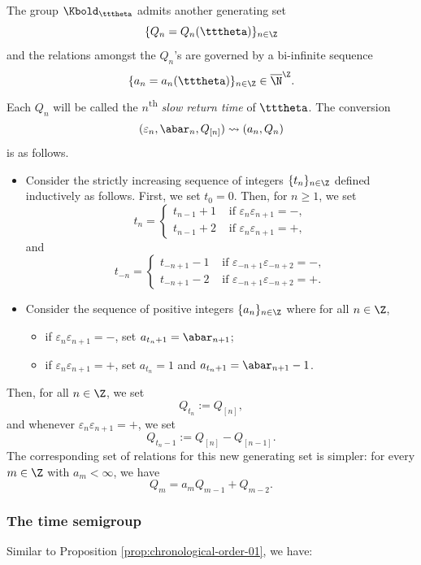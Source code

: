\documentclass{amsart}
\begin{document}
The group $\Kbold_{\tttheta}$ admits another generating set 
\[
\{Q_n=Q_n(\tttheta)\}_{n\in\Z}
\]
and the relations amongst the $Q_n$'s are governed by a bi-infinite sequence 
\[
\{a_n = a_n(\tttheta)\}_{n\in\Z} \in \overline{\N}^{\Z}.
\]
Each $Q_n$ will be called the $n$\textsuperscript{th} \emph{slow return time} of $\tttheta$.
The conversion 
\[
(\varepsilon_n, \abar_n,Q_{[n]}) \leadsto (a_n,Q_n)
\]
is as follows.
\begin{itemize}
    \item Consider the strictly increasing sequence of integers $\{t_n\}_{n \in \Z}$ defined inductively as follows.
    First, we set $t_0 = 0$.
    Then, for $n \geq 1$,
    we set
\[
    t_n = \begin{cases}
        t_{n-1}+1 & \text{ if } \varepsilon_{n} \varepsilon_{n+1} = -,\\
        t_{n-1}+2 & \text{ if } \varepsilon_{n} \varepsilon_{n+1} = +,
    \end{cases}
\]
and 
\[
    t_{-n} = \begin{cases}
        t_{-n+1}-1 & \text{ if } \varepsilon_{-n+1} \varepsilon_{-n+2} = -,\\
        t_{-n+1}-2 & \text{ if } \varepsilon_{-n+1} \varepsilon_{-n+2} = +.
    \end{cases}
\]
    \item Consider the sequence of positive integers $\{a_n\}_{n\in \Z}$ where for all $n \in \Z$,
\begin{itemize}
    \item if $\varepsilon_n \varepsilon_{n+1} = -$, set $a_{t_n + 1} = \abar_{n+1}$;
    \item if $\varepsilon_n \varepsilon_{n+1} = +$, set $a_{t_n} = 1$ and $a_{t_n + 1} = \abar_{n+1}-1$.
\end{itemize}
\end{itemize}
Then, for all $n \in \Z$, we set
\[
    Q_{t_n} := Q_{[n]},
\]
and whenever $\varepsilon_n \varepsilon_{n+1} = +$, we set 
\[
    Q_{t_n-1} := Q_{[n]}-Q_{[n-1]}.
\]
The corresponding set of relations for this new generating set is simpler: for every $m \in \Z$ with $a_m < \infty$, we have
\[
    Q_m = a_m Q_{m-1} + Q_{m-2}.
\]

\subsubsection{The time semigroup}

Similar to Proposition \ref{prop:chronological-order-01}, we have:
\end{document}
